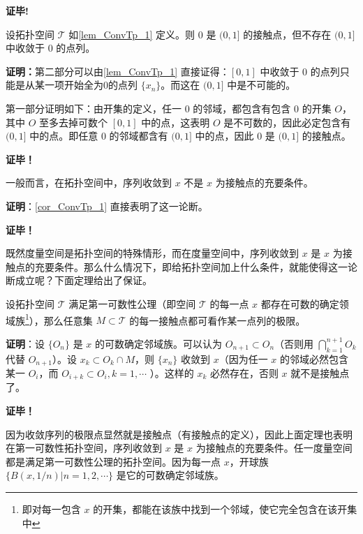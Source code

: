  \textbf{证毕!}

\begin{corollary}{}\label{cor_ConvTp_1}
设拓扑空间 $\mathcal T$ 如\autoref{lem_ConvTp_1} 定义。则 $0$ 是 $(0,1]$ 的接触点，但不存在 $(0,1]$ 中收敛于 $0$ 的点列。
\end{corollary}
\textbf{证明：}第二部分可以由\autoref{lem_ConvTp_1} 直接证得：$[0,1]$ 中收敛于 $0$ 的点列只能是从某一项开始全为0的点列 $\{x_n\}$。而这在 $(0,1]$ 中是不可能的。

第一部分证明如下：由开集的定义，任一 $0$ 的邻域，都包含有包含 $0$ 的开集 $O$，其中 $O$ 至多去掉可数个 $[0,1]$ 中的点，这表明 $O$ 是不可数的，因此必定包含有 $(0,1]$ 中的点。即任意 $0$ 的邻域都含有 $(0,1]$ 中的点，因此 $0$ 是 $(0,1]$ 的接触点。 

\textbf{证毕！}


 \begin{theorem}{}
 一般而言，在拓扑空间中，序列收敛到 $x$ 不是 $x$ 为接触点的充要条件。
 \end{theorem}
 \textbf{证明}：\autoref{cor_ConvTp_1} 直接表明了这一论断。

 \textbf{证毕！}

既然度量空间是拓扑空间的特殊情形，而在度量空间中，序列收敛到 $x$ 是 $x$ 为接触点的充要条件。那么什么情况下，即给拓扑空间加上什么条件，就能使得这一论断成立呢？下面定理给出了保证。


\begin{theorem}{}
设拓扑空间 $\mathcal T$ 满足第一可数性公理（即空间 $\mathcal T$ 的每一点 $x$ 都存在可数的确定领域族\footnote{即对每一包含 $x$ 的开集，都能在该族中找到一个邻域，使它完全包含在该开集中}），那么任意集 $M\subset\mathcal T$ 的每一接触点都可看作某一点列的极限。
\end{theorem}

 \textbf{证明}：设 $\{O_n\}$ 是 $x$ 的可数确定邻域族。可以认为 $O_{n+1}\subset O_n$（否则用 $\bigcap_{k=1}^{n+1} O_{k}$ 代替 $O_{n+1}$）。设 $x_k\subset O_k\cap M$，则 $\{x_n\}$ 收敛到 $x$（因为任一 $x$ 的邻域必然包含某一 $O_i$，而 $O_{i+k}\subset O_{i},k=1,\cdots$ ）。这样的 $x_k$ 必然存在，否则 $x$ 就不是接触点了。 

 
 \textbf{证毕！}

因为收敛序列的极限点显然就是接触点（有接触点的定义），因此上面定理也表明在第一可数性拓扑空间，序列收敛到 $x$ 是 $x$ 为接触点的充要条件。任一度量空间都是满足第一可数性公理的拓扑空间。因为每一点 $x$，开球族 $\{B(x,1/n)|n=1,2,\cdots\}$ 是它的可数确定邻域族。






